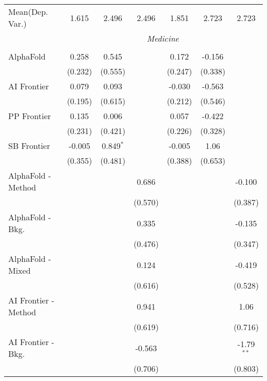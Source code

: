 \begin{tabular}{lcccccc}
Mean(Dep. Var.) & 1.615 & 2.496 & 2.496 & 1.851 & 2.723 & 2.723 \\
 & \multicolumn{6}{c}{\textit{Medicine}} \\ \\
   AlphaFold            & 0.258   & 0.545       &              & 0.172   & -0.156  &   \\   
                        & (0.232) & (0.555)     &              & (0.247) & (0.338) &   \\   
   AI Frontier          & 0.079   & 0.093       &              & -0.030  & -0.563  &   \\   
                        & (0.195) & (0.615)     &              & (0.212) & (0.546) &   \\   
   PP Frontier          & 0.135   & 0.006       &              & 0.057   & -0.422  &   \\   
                        & (0.231) & (0.421)     &              & (0.226) & (0.328) &   \\   
   SB Frontier          & -0.005  & 0.849$^{*}$ &              & -0.005  & 1.06    &   \\   
                        & (0.355) & (0.481)     &              & (0.388) & (0.653) &   \\   
   AlphaFold - Method   &         &             & 0.686        &         &         & -0.100\\   
                        &         &             & (0.570)      &         &         & (0.387)\\   
   AlphaFold - Bkg.     &         &             & 0.335        &         &         & -0.135\\   
                        &         &             & (0.476)      &         &         & (0.347)\\   
   AlphaFold - Mixed    &         &             & 0.124        &         &         & -0.419\\   
                        &         &             & (0.616)      &         &         & (0.528)\\   
   AI Frontier - Method &         &             & 0.941        &         &         & 1.06\\   
                        &         &             & (0.619)      &         &         & (0.716)\\   
   AI Frontier - Bkg.   &         &             & -0.563       &         &         & -1.79$^{**}$\\   
                        &         &             & (0.706)      &         &         & (0.803)\\   

\end{tabular}
